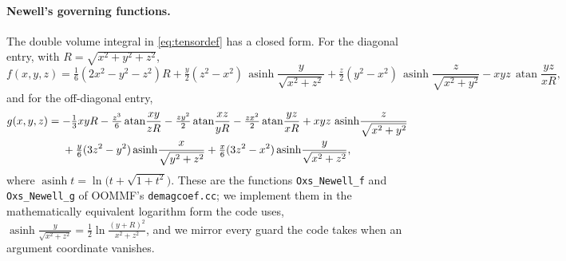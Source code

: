 \documentclass[11pt]{amsart}
\newcommand{\asinh}{\operatorname{asinh}}
\DeclareMathOperator{\atan}{atan}
\theoremstyle{plain}
\theoremstyle{definition}
\theoremstyle{remark}
\begin{document}
\paragraph{Newell's governing functions.}
The double volume integral in \eqref{eq:tensordef} has a closed form. For the
diagonal entry, with $R=\sqrt{x^2+y^2+z^2}$,
\begin{equation}
  f(x,y,z) = \tfrac16(2x^2-y^2-z^2)R
  + \tfrac{y}{2}(z^2-x^2)\,\asinh\!\frac{y}{\sqrt{x^2+z^2}}
  + \tfrac{z}{2}(y^2-x^2)\,\asinh\!\frac{z}{\sqrt{x^2+y^2}}
  - xyz\,\atan\!\frac{yz}{xR},
  \label{eq:newellf}
\end{equation}
and for the off-diagonal entry,
\begin{align}
  g(x,y,z) = {}&{-}\tfrac13 xyR
  - \tfrac{z^3}{6}\atan\!\frac{xy}{zR}
  - \tfrac{z y^2}{2}\atan\!\frac{xz}{yR}
  - \tfrac{z x^2}{2}\atan\!\frac{yz}{xR}
  + xyz\,\asinh\!\frac{z}{\sqrt{x^2+y^2}} \notag\\
  &{}+ \tfrac{y}{6}(3z^2-y^2)\asinh\!\frac{x}{\sqrt{y^2+z^2}}
  + \tfrac{x}{6}(3z^2-x^2)\asinh\!\frac{y}{\sqrt{x^2+z^2}} ,
  \label{eq:newellg}
\end{align}
where $\asinh t=\ln\!\big(t+\sqrt{1+t^2}\big)$. These are the functions
\texttt{Oxs\_Newell\_f} and \texttt{Oxs\_Newell\_g} of OOMMF's
\texttt{demagcoef.cc}; we implement them in the mathematically equivalent
logarithm form the code uses, $\asinh\!\frac{y}{\sqrt{x^2+z^2}}
=\tfrac12\ln\!\frac{(y+R)^2}{x^2+z^2}$, and we mirror every guard the code takes
when an argument coordinate vanishes.
\end{document}
